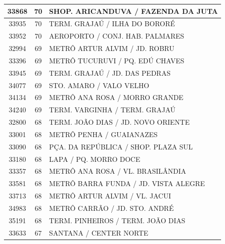 \documentclass[
	12pt,				%
	oneside,			%
	a4paper,			%
	english,			%
	brazil				%
	]{abntex2ppgsi}
\begin{document}
\begin{apendicesenv}
\begin{longtable}{c|c|p{7cm}}
    33868 & 70    & SHOP. ARICANDUVA / FAZENDA DA JUTA \\
\hline

    33935 & 70    & TERM. GRAJAÚ / ILHA DO BORORÉ \\
\hline

    33952 & 70    & AEROPORTO / CONJ. HAB. PALMARES \\
\hline

    32994 & 69    & METRÔ ARTUR ALVIM / JD. ROBRU \\
\hline

    33396 & 69    & METRÔ TUCURUVI / PQ. EDÚ CHAVES \\
\hline

    33945 & 69    & TERM. GRAJAÚ / JD. DAS PEDRAS \\
\hline

    34077 & 69    & STO. AMARO / VALO VELHO \\
\hline

    34134 & 69    & METRÔ ANA ROSA / MORRO GRANDE \\
\hline

    34240 & 69    & TERM. VARGINHA / TERM. GRAJAÚ \\
\hline

    32800 & 68    & TERM. JOÃO DIAS / JD. NOVO ORIENTE \\
\hline

    33001 & 68    & METRÔ PENHA / GUAIANAZES \\
\hline

    33090 & 68    & PÇA. DA REPÚBLICA / SHOP. PLAZA SUL \\
\hline

    33180 & 68    & LAPA / PQ. MORRO DOCE \\
\hline

    33357 & 68    & METRÔ ANA ROSA / VL. BRASILÂNDIA \\
\hline

    33581 & 68    & METRÔ BARRA FUNDA / JD. VISTA ALEGRE \\
\hline

    33713 & 68    & METRÔ ARTUR ALVIM / VL. JACUI \\
\hline

    34983 & 68    & METRÔ CARRÃO / JD. STO. ANDRÉ \\
\hline

    35191 & 68    & TERM. PINHEIROS / TERM. JOÃO DIAS \\
\hline

    33633 & 67    & SANTANA / CENTER NORTE \\
\hline


\end{longtable}
\end{apendicesenv}
\end{document}
